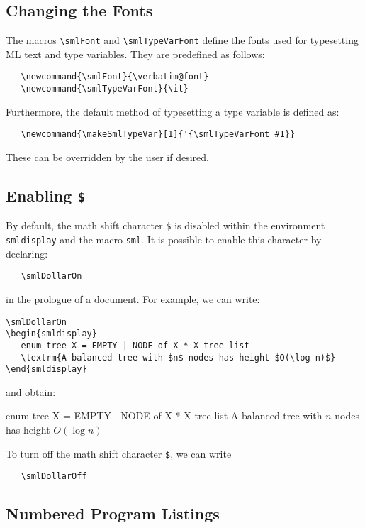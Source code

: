 \documentclass{article}
\begin{document}
\subsection{Changing the Fonts}
The macros \verb|\smlFont| and \verb|\smlTypeVarFont| 
define the fonts used for typesetting ML text and type variables.  
They are predefined as follows:
\begin{verbatim}
   \newcommand{\smlFont}{\verbatim@font}
   \newcommand{\smlTypeVarFont}{\it}
\end{verbatim}
Furthermore, the default method of typesetting a type variable
is defined as: 
\begin{verbatim}
   \newcommand{\makeSmlTypeVar}[1]{'{\smlTypeVarFont #1}}
\end{verbatim}
These can be overridden by the user if desired.

\subsection{Enabling {\tt \$}}
By default, the math shift character \verb|$| 
is disabled within the environment \verb|smldisplay|
and the macro \verb|sml|.  It is possible to
enable this character by declaring:
\begin{verbatim}
   \smlDollarOn
\end{verbatim}
\noindent in the prologue of a document.
For example, we can write:
\begin{verbatim}
\smlDollarOn
\begin{smldisplay}
   enum tree X = EMPTY | NODE of X * X tree list
   \textrm{A balanced tree with $n$ nodes has height $O(\log n)$}
\end{smldisplay}
\end{verbatim}
and obtain:
\smlDollarOn
\begin{smldisplay}
   enum tree X = EMPTY | NODE of X * X tree list
   \textrm{A balanced tree with $n$ nodes has height $O(\log n)$}
\end{smldisplay}

To turn off the math shift character \verb|$|, we can
write 
\begin{verbatim}
   \smlDollarOff
\end{verbatim}

\subsection{Numbered Program Listings}
\end{document}
